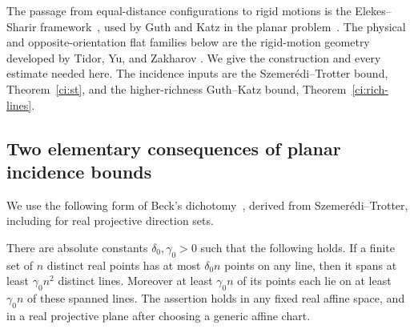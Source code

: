 The passage from equal-distance configurations to rigid motions is the
Elekes--Sharir framework~\cite{elekessharir2011}, used by Guth and
Katz in the planar problem~\cite{guthkatz2015}.  The physical and
opposite-orientation flat families below are the rigid-motion geometry
developed by Tidor, Yu, and Zakharov
\cite[Section~3]{tidoryuzakharov2026}.  We give the construction and every
estimate needed here.  The incidence inputs are the
Szemer\'edi--Trotter bound, Theorem~\ref{ci:st}, and the
higher-richness Guth--Katz bound, Theorem~\ref{ci:rich-lines}.

\subsection{Two elementary consequences of planar incidence bounds}

We use the following form of Beck's dichotomy~\cite{beck1983}, derived from
Szemer\'edi--Trotter, including for real projective direction sets.

\begin{lemma}
\label{mot:beck}
There are absolute constants \(\delta_0,\gamma_0>0\) such that the
following holds.  If a finite set of \(n\) distinct real points has
at most \(\delta_0 n\) points on any line, then it spans at least
\(\gamma_0 n^2\) distinct lines.  Moreover at least
\(\gamma_0 n\) of its points each lie on at least
\(\gamma_0 n\) of these spanned lines.
The assertion holds in any fixed real affine space, and in a real
projective plane after choosing a generic affine chart.
\end{lemma}


